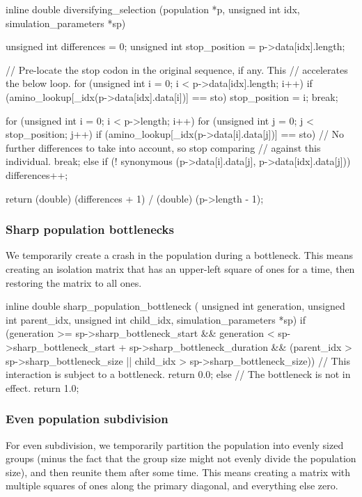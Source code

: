 \documentclass{article}
\begin{document}
\begin{ccode}
inline double diversifying_selection (population *p, unsigned int idx, simulation_parameters *sp) {
  unsigned int differences = 0;
  unsigned int stop_position = p->data[idx].length;

  // Pre-locate the stop codon in the original sequence, if any. This
  // accelerates the below loop.
  for (unsigned int i = 0; i < p->data[idx].length; i++)
    if (amino_lookup[_idx(p->data[idx].data[i])] == sto) {
      stop_position = i;
      break;
    }

  for (unsigned int i = 0; i < p->length; i++)
    for (unsigned int j = 0; j < stop_position; j++)
      if (amino_lookup[_idx(p->data[i].data[j])] == sto)
	// No further differences to take into account, so stop comparing
	// against this individual.
	break;
      else if (! synonymous (p->data[i].data[j], p->data[idx].data[j]))
	differences++;

  return (double) (differences + 1) / (double) (p->length - 1);
}
\end{ccode}

      \subsubsection{Sharp population bottlenecks}

	We temporarily create a crash in the population during a bottleneck.
	This means creating an isolation matrix that has an upper-left square of
	ones for a time, then restoring the matrix to all ones.

\begin{ccode}
inline double sharp_population_bottleneck (
    unsigned int generation, unsigned int parent_idx,
    unsigned int child_idx, simulation_parameters *sp) {
  if (generation >= sp->sharp_bottleneck_start &&
      generation < sp->sharp_bottleneck_start + sp->sharp_bottleneck_duration &&
      (parent_idx > sp->sharp_bottleneck_size ||
       child_idx > sp->sharp_bottleneck_size))
    // This interaction is subject to a bottleneck.
    return 0.0;
  else
    // The bottleneck is not in effect.
    return 1.0;
}
\end{ccode}

      \subsubsection{Even population subdivision}

	For even subdivision, we temporarily partition the population into
	evenly sized groups (minus the fact that the group size might not evenly
	    divide the population size), and then reunite them after some time.
	This means creating a matrix with multiple squares of ones along the
	primary diagonal, and everything else zero.
\end{document}
